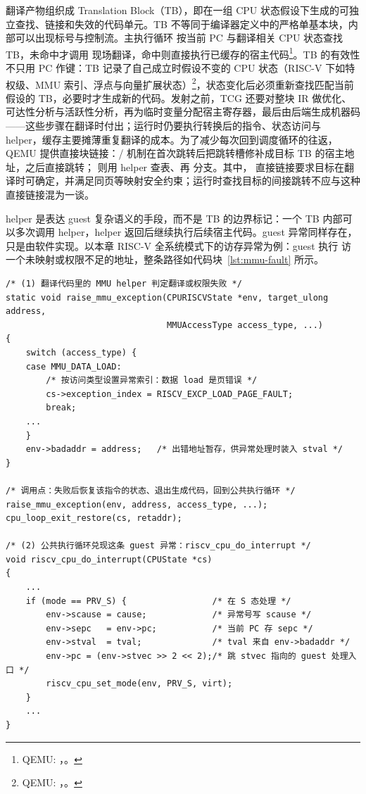 翻译产物组织成 Translation Block（TB），即在一组 CPU 状态假设下生成的可独立查找、链接和失效的代码单元。TB 不等同于编译器定义中的严格单基本块，内部可以出现标号与控制流。主执行循环  按当前 PC 与翻译相关 CPU 状态查找 TB，未命中才调用  现场翻译，命中则直接执行已缓存的宿主代码\footnote{QEMU: ，。}。TB 的有效性不只用 PC 作键：TB 记录了自己成立时假设不变的 CPU 状态（RISC-V 下如特权级、MMU 索引、浮点与向量扩展状态）\footnote{QEMU: ，。}，状态变化后必须重新查找匹配当前假设的 TB，必要时才生成新的代码。发射之前，TCG 还要对整块 IR 做优化、可达性分析与活跃性分析，再为临时变量分配宿主寄存器，最后由后端生成机器码——这些步骤在翻译时付出；运行时仍要执行转换后的指令、状态访问与 helper，缓存主要摊薄重复翻译的成本\cite{source3}。为了减少每次回到调度循环的往返，QEMU 提供直接块链接：/ 机制在首次跳转后把跳转槽修补成目标 TB 的宿主地址，之后直接跳转； 则用 helper 查表、再  分支\cite{source3}。其中， 直接链接要求目标在翻译时可确定，并满足同页等映射安全约束；运行时查找目标的间接跳转不应与这种直接链接混为一谈。

helper 是表达 guest 复杂语义的手段，而不是 TB 的边界标记：一个 TB 内部可以多次调用 helper，helper 返回后继续执行后续宿主代码。guest 异常同样存在，只是由软件实现。以本章 RISC-V 全系统模式下的访存异常为例：guest 执行  访一个未映射或权限不足的地址，整条路径如代码块~\ref{lst:mmu-fault} 所示。

\begin{lstlisting}[caption={lw 触发 guest 页错误的处理链路（QEMU target/riscv/tcg/cpu\_helper.c，节选并注释）},label={lst:mmu-fault}]
/* (1) 翻译代码里的 MMU helper 判定翻译或权限失败 */
static void raise_mmu_exception(CPURISCVState *env, target_ulong address,
                                MMUAccessType access_type, ...)
{
    switch (access_type) {
    case MMU_DATA_LOAD:
        /* 按访问类型设置异常索引：数据 load 是页错误 */
        cs->exception_index = RISCV_EXCP_LOAD_PAGE_FAULT;
        break;
    ...
    }
    env->badaddr = address;   /* 出错地址暂存，供异常处理时装入 stval */
}

/* 调用点：失败后恢复该指令的状态、退出生成代码，回到公共执行循环 */
raise_mmu_exception(env, address, access_type, ...);
cpu_loop_exit_restore(cs, retaddr);

/* (2) 公共执行循环兑现这条 guest 异常：riscv_cpu_do_interrupt */
void riscv_cpu_do_interrupt(CPUState *cs)
{
    ...
    if (mode == PRV_S) {                 /* 在 S 态处理 */
        env->scause = cause;             /* 异常号写 scause */
        env->sepc   = env->pc;           /* 当前 PC 存 sepc */
        env->stval  = tval;              /* tval 来自 env->badaddr */
        env->pc = (env->stvec >> 2 << 2);/* 跳 stvec 指向的 guest 处理入口 */
        riscv_cpu_set_mode(env, PRV_S, virt);
    }
    ...
}
\end{lstlisting}

